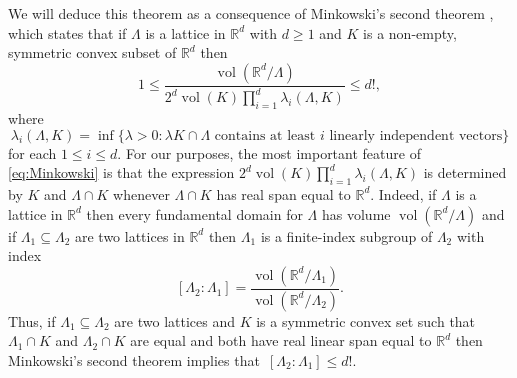 \documentclass[11pt]{article}
\numberwithin{equation}{section}
\theoremstyle{plain}
\theoremstyle{definition}
\theoremstyle{remark}
\numberwithin{equation}{section}
\newcommand{\R}{\mathbb R}
\numberwithin{equation}{section}
\begin{document}
We will deduce this theorem as a consequence of Minkowski's second theorem \cite[p. 203]{MR1434478}, which states that if $\Lambda$ is a lattice in $\R^d$ with $d\geq 1$ and $K$ is a non-empty, symmetric convex subset of $\R^d$ then
\begin{equation}
\label{eq:Minkowski}
 1 \leq \frac{\operatorname{vol}(\R^d/\Lambda)}{2^d \operatorname{vol}(K) \prod_{i=1}^d \lambda_i(\Lambda,K)} \leq d!,
\end{equation}
where 
\[
\lambda_i(\Lambda,K)=\inf\bigl\{\lambda>0: \lambda K \cap \Lambda \text{ contains at least $i$ linearly independent vectors}\bigr\}
\]
for each $1\leq i \leq d$. 
For our purposes, the most important feature of \eqref{eq:Minkowski} is that the expression $2^d \operatorname{vol}(K) \prod_{i=1}^d \lambda_i(\Lambda,K)$ is determined by $K$ and $\Lambda \cap K$ whenever $\Lambda \cap K$ has real span equal to $\R^d$. Indeed, if $\Lambda$ is a lattice in $\R^d$ then every fundamental domain for $\Lambda$ has volume $\operatorname{vol}(\R^d/\Lambda)$ and if $\Lambda_1 \subseteq \Lambda_2$ are two lattices in $\R^d$ then $\Lambda_1$ is a finite-index subgroup of $\Lambda_2$ with index
\[
[\Lambda_2:\Lambda_1] = \frac{\operatorname{vol}(\R^d/\Lambda_1)}{\operatorname{vol}(\R^d/\Lambda_2)}.
\] Thus, if $\Lambda_1 \subseteq \Lambda_2$ are two lattices and $K$ is a symmetric convex set such that $\Lambda_1 \cap K$ and $\Lambda_2 \cap K$ are equal and both have real linear span equal to $\R^d$ then Minkowski's second theorem implies that~$[\Lambda_2:\Lambda_1] \leq d!$.
\end{document}
